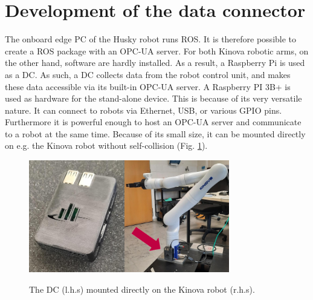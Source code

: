 \documentclass[conference]{IEEEtran}
\begin{document}
\section{Development of the data connector}
The onboard edge PC of the Husky robot  runs ROS. It is therefore possible to create a ROS package with an OPC-UA server.
For both Kinova robotic arms, on the other hand,  software are hardly installed. As a result, a Raspberry Pi is used as a DC. As such, a DC collects  data from the robot control unit, and makes these data accessible via its built-in OPC-UA server. A Raspberry PI 3B+ is used as hardware for the stand-alone device. This is because of its very versatile nature. It can connect to robots via Ethernet, USB, or various GPIO pins. Furthermore it is powerful enough to host an OPC-UA server and communicate to a robot at the same time.
Because of its small size, it can be mounted directly on e.g. the Kinova robot without self-collision (Fig. \ref{fig:dataConectorPic}).\\

\begin{figure}[t]
    \centerline{\includegraphics[height=4.9cm]{Pictures/PiGehaeuseVorne.jpeg}\hspace{0.1cm}\includegraphics[height=4.9cm]{Pictures/PiAmKinova.jpeg}}
    \caption{The DC (l.h.s) mounted directly on the Kinova robot (r.h.s).}
    \label{fig:dataConectorPic}
\end{figure}
\end{document}
